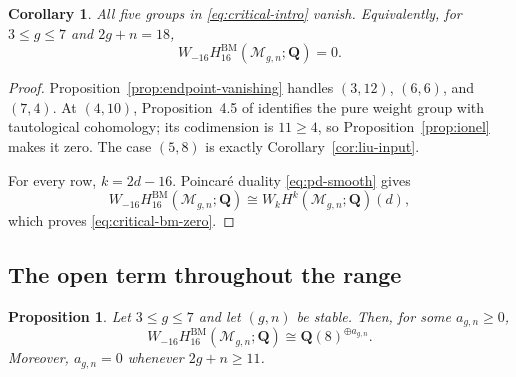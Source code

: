 \documentclass[12pt,reqno]{amsart}
\newcommand{\Q}{\mathbf{Q}}
\newcommand{\M}{\mathcal{M}}
\newcommand{\BM}{\mathrm{BM}}
\newtheorem{proposition}[theorem]{Proposition}
\newtheorem{corollary}[theorem]{Corollary}
\theoremstyle{definition}
\theoremstyle{remark}
\begin{document}
\begin{corollary}\label{cor:critical-vanishing}
All five groups in \eqref{eq:critical-intro} vanish.  Equivalently, for
$3\leq g\leq7$ and $2g+n=18$,
\begin{equation}\label{eq:critical-bm-zero}
 W_{-16}H^{\BM}_{16}(\M_{g,n};\Q)=0.
\end{equation}
\end{corollary}

\begin{proof}
Proposition~\ref{prop:endpoint-vanishing} handles $(3,12)$, $(6,6)$, and
$(7,4)$.  At $(4,10)$, Proposition~4.5 of \cite{CLP} identifies the pure
weight group with tautological cohomology; its codimension is $11\geq4$, so
Proposition~\ref{prop:ionel} makes it zero.  The case $(5,8)$ is exactly
Corollary~\ref{cor:liu-input}.

For every row, $k=2d-16$.  Poincar\'e duality \eqref{eq:pd-smooth} gives
\[
 W_{-16}H^{\BM}_{16}(\M_{g,n};\Q)
 \cong W_kH^k(\M_{g,n};\Q)(d),
\]
which proves \eqref{eq:critical-bm-zero}.
\end{proof}

\subsection{The open term throughout the range}

\begin{proposition}\label{prop:open-all}
Let $3\leq g\leq7$ and let $(g,n)$ be stable.  Then, for some
$a_{g,n}\geq0$,
\begin{equation}\label{eq:open-all}
 W_{-16}H_{16}^{\BM}(\M_{g,n};\Q)
 \cong\Q(8)^{\oplus a_{g,n}}.
\end{equation}
Moreover, $a_{g,n}=0$ whenever $2g+n\geq11$.
\end{proposition}
\end{document}
